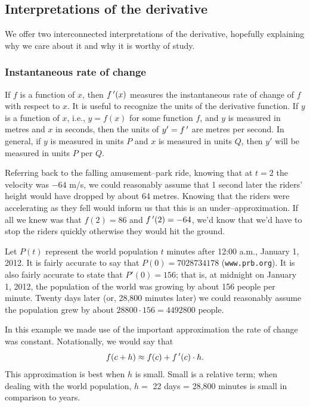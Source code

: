 \ifcourse

\subsection{Interpretations of the derivative}\label{sec:interp_deriv}
We offer two interconnected interpretations of the derivative, hopefully explaining why we care about it and why it is worthy of study.

\subsubsection{Instantaneous rate of change}
If $f$ is a function of $x$, then $f\,'(x)$ measures the instantaneous rate of change of $f$ with respect to $x$. It is useful to recognize the units of the derivative function. If $y$ is a function of $x$, i.e., $y=f(x)$ for some function $f$, and $y$ is measured in metres and $x$ in seconds, then the units of $y' = f\,'$ are metres per second. In general, if $y$ is measured in units $P$ and $x$ is measured in units $Q$, then $y'$ will be measured in units $P$ per $Q$.


Referring back to the falling amusement--park ride, knowing that at $t=2$ the velocity was $-64$ m/s, we could reasonably assume that 1 second later the riders' height would have dropped by about 64 metres. Knowing that the riders were accelerating as they fell would inform us that this is an under--approximation. If all we knew was that $f(2) = 86$ and $f\,'(2) = -64$, we'd know that we'd have to stop the riders quickly otherwise they would hit the ground.




\begin{example}\label{ex_der_meaning1}
Let $P(t)$ represent the world population $t$ minutes after 12:00 a.m., January 1, 2012. It is fairly accurate to say that $P(0) = 7 028 734 178$ (\texttt{www.prb.org}). It is also fairly accurate to state that $P'(0) = 156$; that is, at midnight on January 1, 2012, the population of the world was growing by about 156 people per minute. Twenty days later (or, 28,800 minutes later) we could reasonably assume the population grew by about $28 800\cdot156 = 4 492 800$ people.
\end{example}

In this example we made use of the important approximation the rate of change was constant. Notationally, we would say that 
	$$f(c+h) \approx f(c) + f\,'(c)\cdot h.$$ This approximation is best when $h$ is  small. Small is a relative term; when dealing with the world population, $h=$ 22 days = 28,800 minutes is small in comparison to years.
	
